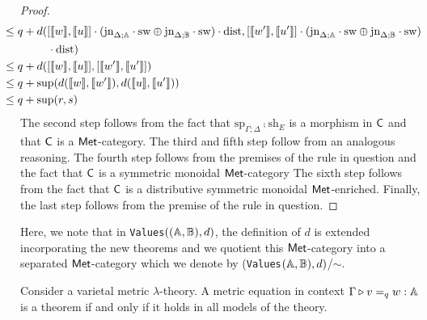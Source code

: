 \begin{proof}
\begin{align*}
    & \hspace{-20pt} \leq  q +  d( [\llbracket w\rrbracket ,\llbracket u\rrbracket] \comp (\text{jn}_{\Delta;\typeA}\comp \sw \oplus \text{jn}_{\Delta;\typeB}\comp \sw) \comp \dist,  [\llbracket w'\rrbracket ,\llbracket u'\rrbracket] \comp (\text{jn}_{\Delta;\typeA}\comp \sw \oplus \text{jn}_{\Delta;\typeB}\comp \sw)  \\
    & \hspace{20pt} \comp \dist)\\
    &  \hspace{-20pt} \leq q +  d( [\llbracket w\rrbracket ,\llbracket u\rrbracket],  [\llbracket w'\rrbracket ,\llbracket u'\rrbracket]) \\
    & \hspace{-20pt}  \leq q + \sup(d( \llbracket w\rrbracket , \llbracket w' \rrbracket), d( \llbracket u\rrbracket , \llbracket u' \rrbracket)) \\
    & \hspace{-20pt} \leq  q + \sup(r, s) \\
  \end{align*}
  The second step follows from the fact that $\text{sp}_{\Gamma;\Delta} \comp \text{sh}_{E}$  is a morphism in $\mathsf{C}$  and that $\mathsf{C}$ is a $\mathsf{Met}$-category.  The third and fifth step follow from an analogous reasoning. The fourth step follows from the premises of the rule in question and the fact that $\mathsf{C}$ is a symmetric monoidal $\mathsf{Met}$-category The sixth step follows from the fact that $\mathsf{C}$ is a distributive symmetric monoidal $\mathsf{Met}$-enriched. Finally, the last step follows from the premise of the rule in question.

\end{proof}

Here, we note that in \texttt{Values}$((\mathbb{A},\mathbb{B}),d)$, the definition of $d$ is extended incorporating the new theorems and we  quotient this  $\mathsf{Met}$-category into a separated  $\mathsf{Met}$-category which we denote by (\texttt{Values}$(\mathbb{A},\mathbb{B}),d)$/$\sim$.


\begin{theorem}[Completeness] \cite[Theorem 3.16]{dahlqvist2022syntactic} \label{thm:completeness_metric_no_cond}
Consider a varietal metric $\lambda$-theory. A metric equation in context
$\Gamma \triangleright v =_{q} w : \mathbb{A}$
is a theorem if and only if it holds in all models of the theory.
\end{theorem}

